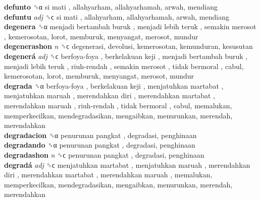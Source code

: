 \textbf{defunto} ␝α   si mati , allahyarham, allahyarhamah, arwah, mendiang  \\
\textbf{defuntu} \emph{adj}  ␝ϲ   si mati , allahyarham, allahyarhamah, arwah, mendiang  \\
\textbf{degenera} ␝α   menjadi bertambah buruk ,  menjadi lebih teruk ,  semakin merosot , kemerosotan, lorot, memburuk, menyangat, merosot, mundur  \\
\textbf{degenerashon} \emph{n}  ␝ϲ  degenerasi, devolusi, kemerosotan, kemunduran, kesusutan  \\
\textbf{degenerá} \emph{adj}  ␝ϲ   berfoya-foya ,  berkelakuan keji ,  menjadi bertambah buruk ,  menjadi lebih teruk ,  riuh-rendah ,  semakin merosot ,  tidak bermoral , cabul, kemerosotan, lorot, memburuk, menyangat, merosot, mundur  \\
\textbf{degrada} ␝α   berfoya-foya ,  berkelakuan keji ,  menjatuhkan martabat ,  menjatuhkan maruah ,  merendahkan diri ,  merendahkan martabat ,  merendahkan maruah ,  riuh-rendah ,  tidak bermoral , cabul, memalukan, memperkecilkan, mendegradasikan, mengaibkan, menurunkan, merendah, merendahkan  \\
\textbf{degradacion} ␝α   penurunan pangkat , degradasi, penghinaan  \\
\textbf{degradando} ␝α   penurunan pangkat , degradasi, penghinaan  \\
\textbf{degradashon} \emph{n}  ␝ϲ   penurunan pangkat , degradasi, penghinaan  \\
\textbf{degradá} \emph{adj}  ␝ϲ   menjatuhkan martabat ,  menjatuhkan maruah ,  merendahkan diri ,  merendahkan martabat ,  merendahkan maruah , memalukan, memperkecilkan, mendegradasikan, mengaibkan, menurunkan, merendah, merendahkan  \\

